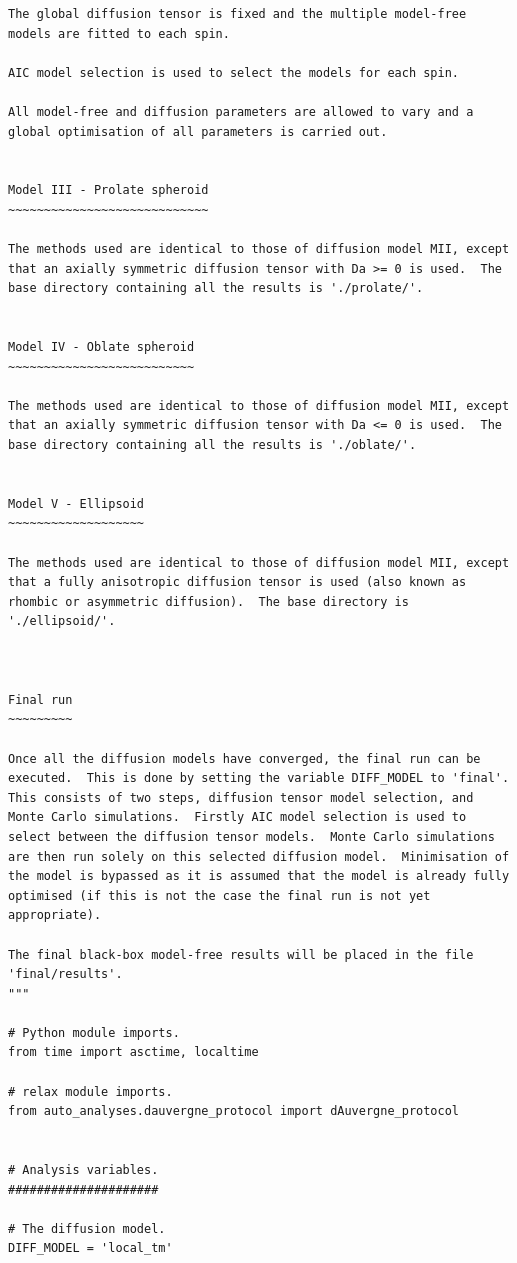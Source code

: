 \begin{htmlonly}
\begin{htmlonly}
\begin{lstlisting}
The global diffusion tensor is fixed and the multiple model-free models are fitted to each spin.

AIC model selection is used to select the models for each spin.

All model-free and diffusion parameters are allowed to vary and a global optimisation of all parameters is carried out.


Model III - Prolate spheroid
~~~~~~~~~~~~~~~~~~~~~~~~~~~~

The methods used are identical to those of diffusion model MII, except that an axially symmetric diffusion tensor with Da >= 0 is used.  The base directory containing all the results is './prolate/'.


Model IV - Oblate spheroid
~~~~~~~~~~~~~~~~~~~~~~~~~~

The methods used are identical to those of diffusion model MII, except that an axially symmetric diffusion tensor with Da <= 0 is used.  The base directory containing all the results is './oblate/'.


Model V - Ellipsoid
~~~~~~~~~~~~~~~~~~~

The methods used are identical to those of diffusion model MII, except that a fully anisotropic diffusion tensor is used (also known as rhombic or asymmetric diffusion).  The base directory is './ellipsoid/'.



Final run
~~~~~~~~~

Once all the diffusion models have converged, the final run can be executed.  This is done by setting the variable DIFF_MODEL to 'final'.  This consists of two steps, diffusion tensor model selection, and Monte Carlo simulations.  Firstly AIC model selection is used to select between the diffusion tensor models.  Monte Carlo simulations are then run solely on this selected diffusion model.  Minimisation of the model is bypassed as it is assumed that the model is already fully optimised (if this is not the case the final run is not yet appropriate).

The final black-box model-free results will be placed in the file 'final/results'.
"""

# Python module imports.
from time import asctime, localtime

# relax module imports.
from auto_analyses.dauvergne_protocol import dAuvergne_protocol


# Analysis variables.
#####################

# The diffusion model.
DIFF_MODEL = 'local_tm'


\end{lstlisting}
\end{htmlonly}
\end{htmlonly}
